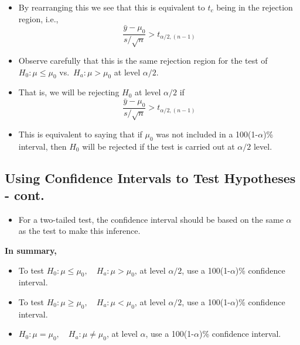 \documentclass[
  letterpaper,
  DIV=11,
  numbers=noendperiod]{scrartcl}
\providecommand{\tightlist}{%
  \setlength{\itemsep}{0pt}\setlength{\parskip}{0pt}}\usepackage{longtable,booktabs,array}
\begin{document}
\begin{itemize}
\item
  By rearranging this we see that this is equivalent to \(t_c\) being in
  the rejection region, i.e.,\\
  \[\frac{\bar{y}-\mu_0}{s/\sqrt{n}} > t_{\alpha/2,(n-1)}\]
\item
  Observe carefully that this is the same rejection region for the test
  of \(H_0: \mu \leq  \mu_0\) vs.~\(H_a: \mu >
  \mu_0\) at level \(\alpha/2\).
\item
  That is, we will be rejecting \(H_0\) {at level \(\alpha/2\)} if\\
  \[\frac{\bar{y}-\mu_0}{s/\sqrt{n}} > t_{\alpha/2,(n-1)}\]
\item
  This is equivalent to saying that {if \(\mu_0\) was not included in a
  100(1-\(\alpha\))\% interval, then \(H_0\) will be rejected if the
  test is carried out at \(\alpha/2\) level}.
\end{itemize}

\subsection{Using Confidence Intervals to Test Hypotheses -
cont.}\label{using-confidence-intervals-to-test-hypotheses---cont.-1}

\begin{itemize}
\tightlist
\item
  For {a two-tailed test}, the confidence interval should be based on
  the same \(\alpha\) as the test to make this inference.
\end{itemize}

{\textbf{In summary,}}

\begin{itemize}
\item
  To test \(H_0: \mu \leq \mu_0, \quad H_a: \mu > \mu_0\), at level
  \(\alpha/2\), use a 100(1-\(\alpha\))\% confidence interval.
\item
  To test \(H_0: \mu \geq \mu_0, \quad H_a: \mu < \mu_0\), at level
  \(\alpha/2\), use a 100(1-\(\alpha\))\% confidence interval.
\item
  \(H_0: \mu = \mu_0, \quad H_a: \mu \neq \mu_0\), at level \(\alpha\),
  use a 100(1-\(\alpha\))\% confidence interval.
\end{itemize}
\end{document}
